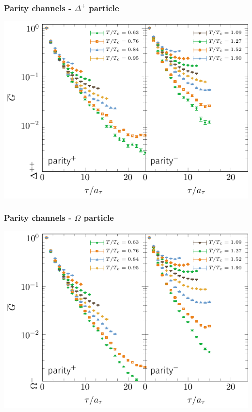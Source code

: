 \documentclass[11pt]{beamer}
\begin{document}
\begin{frame}
  \frametitle{Parity channels - $\Delta^{+}$ particle}

  \begin{center}
    \hspace*{-10mm}
    \includegraphics[width=\textwidth]{plots/correlator_delta.pdf}
  \end{center}

\end{frame}

\begin{frame}
  \frametitle{Parity channels - $\Omega$ particle}

  \begin{center}
    \hspace*{-10mm}
    \includegraphics[width=\textwidth]{plots/correlator_omega.pdf}
  \end{center}

\end{frame}
\end{document}
